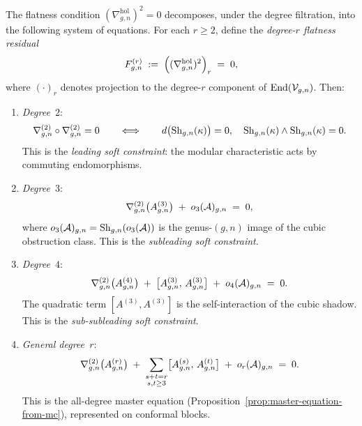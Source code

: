 \begin{theorem}
\label{thm:thqg-VI-flatness-by-degree}
The flatness condition
$(\nabla^{\mathrm{hol}}_{g,n})^2 = 0$
decomposes, under the degree filtration, into the following
system of equations. For each $r \geq 2$, define the
\emph{degree-$r$ flatness residual}
\begin{equation}\label{eq:thqg-VI-flatness-degree-r}
F^{(r)}_{g,n}
\;:=\;
\Bigl(
(\nabla^{\mathrm{hol}}_{g,n})^2
\Bigr)_{r}
\;=\; 0,
\end{equation}
where $(\cdot)_r$ denotes projection to the degree-$r$ component
of $\operatorname{End}(\mathcal{V}_{g,n})$. Then:
\begin{enumerate}[label=\textup{(\alph*)}]
\item \emph{Degree~$2$}:
\begin{equation}\label{eq:thqg-VI-flat-degree-2}
\nabla^{(2)}_{g,n} \circ \nabla^{(2)}_{g,n} = 0
\qquad\Longleftrightarrow\qquad
d\bigl(\operatorname{Sh}_{g,n}(\kappa)\bigr) = 0,
\quad
\operatorname{Sh}_{g,n}(\kappa) \wedge \operatorname{Sh}_{g,n}(\kappa) = 0.
\end{equation}
This is the \emph{leading soft constraint}: the modular
characteristic acts by commuting endomorphisms.
\item \emph{Degree~$3$}:
\begin{equation}\label{eq:thqg-VI-flat-degree-3}
\nabla^{(2)}_{g,n}\bigl(A^{(3)}_{g,n}\bigr)
\;+\;
o_3(\mathcal{A})_{g,n}
\;=\; 0,
\end{equation}
where $o_3(\mathcal{A})_{g,n} = \operatorname{Sh}_{g,n}(o_3(\mathcal{A}))$ is the genus-$(g,n)$
image of the cubic obstruction class. This is the
\emph{subleading soft constraint}.
\item \emph{Degree~$4$}:
\begin{equation}\label{eq:thqg-VI-flat-degree-4}
\nabla^{(2)}_{g,n}\bigl(A^{(4)}_{g,n}\bigr)
\;+\;
\bigl[A^{(3)}_{g,n},\, A^{(3)}_{g,n}\bigr]
\;+\;
o_4(\mathcal{A})_{g,n}
\;=\; 0.
\end{equation}
The quadratic term $[A^{(3)}, A^{(3)}]$ is the self-interaction
of the cubic shadow. This is the \emph{sub-subleading soft
constraint}.
\item \emph{General degree~$r$}:
\begin{equation}\label{eq:thqg-VI-flat-degree-r-general}
\nabla^{(2)}_{g,n}\bigl(A^{(r)}_{g,n}\bigr)
\;+\;
\sum_{\substack{s+t = r \\ s,t \geq 3}}
\bigl[A^{(s)}_{g,n},\, A^{(t)}_{g,n}\bigr]
\;+\;
o_r(\mathcal{A})_{g,n}
\;=\; 0.
\end{equation}
This is the all-degree master equation
(Proposition~\ref{prop:master-equation-from-mc}), represented on
conformal blocks.
\end{enumerate}
\end{theorem}

